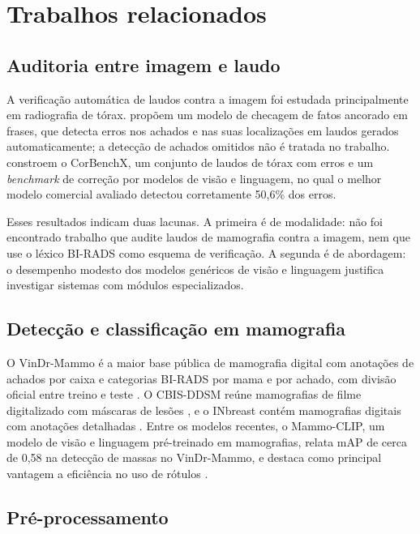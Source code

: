 \section{Trabalhos relacionados}

\subsection{Auditoria entre imagem e laudo}

A verificação automática de laudos contra a imagem foi estudada principalmente em radiografia de tórax.  propõem um modelo de checagem de fatos ancorado em frases, que detecta erros nos achados e nas suas localizações em laudos gerados automaticamente; a detecção de achados omitidos não é tratada no trabalho.  constroem o CorBenchX, um conjunto de laudos de tórax com erros e um \textit{benchmark} de correção por modelos de visão e linguagem, no qual o melhor modelo comercial avaliado detectou corretamente 50,6\% dos erros. 

Esses resultados indicam duas lacunas. A primeira é de modalidade: não foi encontrado trabalho que audite laudos de mamografia contra a imagem, nem que use o léxico BI-RADS como esquema de verificação. A segunda é de abordagem: o desempenho modesto dos modelos genéricos de visão e linguagem justifica investigar sistemas com módulos especializados.

\subsection{Detecção e classificação em mamografia}

O VinDr-Mammo é a maior base pública de mamografia digital com anotações de achados por caixa e categorias BI-RADS por mama e por achado, com divisão oficial entre treino e teste \cite{nguyen2023vindr}. O CBIS-DDSM reúne mamografias de filme digitalizado com máscaras de lesões \cite{lee2017cbis}, e o INbreast contém mamografias digitais com anotações detalhadas \cite{moreira2012inbreast}. Entre os modelos recentes, o Mammo-CLIP, um modelo de visão e linguagem pré-treinado em mamografias, relata mAP de cerca de 0,58 na detecção de massas no VinDr-Mammo, e destaca como principal vantagem a eficiência no uso de rótulos \cite{ghosh2024mammoclip}.

\subsection{Pré-processamento}

